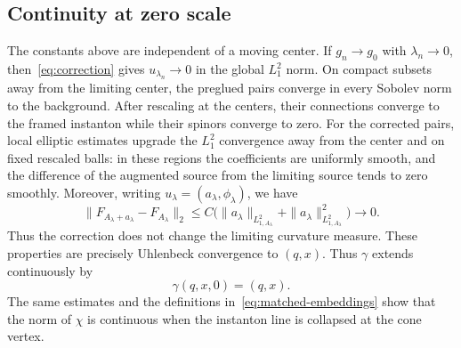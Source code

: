 \documentclass[11pt]{amsart}
\theoremstyle{definition}
\theoremstyle{remark}
\theoremstyle{plain}
\begin{document}
\subsection{Continuity at zero scale}
The constants above are independent of a moving center.  If
$g_n\to g_0$ with $\lambda_n\to0$, then~\eqref{eq:correction} gives
$u_{\lambda_n}\to0$ in the global $L^2_1$ norm.  On compact subsets away from
the limiting center, the preglued pairs converge in every Sobolev norm to
the background.  After rescaling at the centers, their connections converge
to the framed instanton while their spinors converge to zero.  For the
corrected pairs, local elliptic estimates upgrade the $L^2_1$ convergence
away from the center and on fixed rescaled balls: in these regions
the coefficients are uniformly smooth, and the difference of the
augmented source from the limiting source tends to zero smoothly.
Moreover, writing $u_\lambda=(a_\lambda,\phi_\lambda)$, we have
\[
 \|F_{A_\lambda+a_\lambda}-F_{A_\lambda}\|_2
 \leq C\bigl(\|a_\lambda\|_{L^2_{1,A_\lambda}}+
             \|a_\lambda\|_{L^2_{1,A_\lambda}}^2\bigr)\longrightarrow0.
\]
Thus the correction does not change the limiting curvature measure.
These properties are precisely Uhlenbeck
convergence to $(q,x)$.  Thus $\gamma$ extends continuously by
\begin{equation}\label{eq:zero-scale-map}
 \gamma(q,x,0)=(q,x).
\end{equation}
The same estimates and the definitions in~\eqref{eq:matched-embeddings}
show that the norm of $\chi$ is continuous when the instanton line is
collapsed at the cone vertex.
\end{document}
